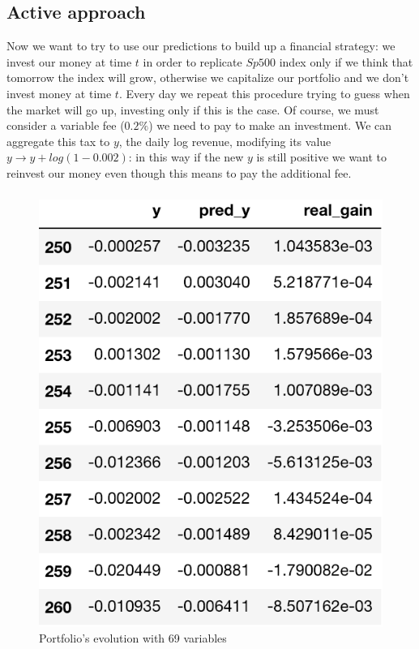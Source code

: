 \documentclass{article}%
\begin{document}
\subsection{Active approach}
Now we want to try to use our predictions to build up a financial strategy: we invest our money at time $t$  in order to replicate $Sp500$ index only if we think that tomorrow the index will grow, otherwise we capitalize our portfolio and we don't invest money at time $t$. Every day we repeat this procedure trying to guess when the market will go up, investing only if this is the case.  Of course, we must consider a variable fee ($0.2\%$) we need to pay to make an investment.  We can aggregate this tax
to $y$, the daily log revenue, modifying its value $y\rightarrow y+log(1-0.002)$: in this way if the new $y$ is still positive we want to reinvest our money even though this means to pay the additional fee.

\subsubsection{}
  \begin{figure}[h!]
  \centering
  \includegraphics[scale=0.6]{act_port.png}
  \caption{Portfolio's evolution with 69 variables}
  \label{portfolio_alpha}
  \end{figure}
  
\end{document}
